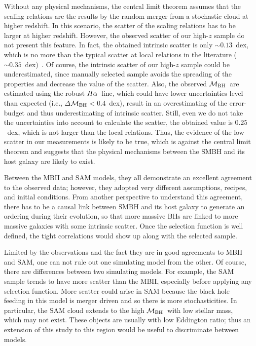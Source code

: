 \documentclass{natureprintstyle}
\newcommand{\mbh}{$\mathcal M_{\rm BH}$}
\newcommand{\halpha}{${\it H}\alpha$}
\begin{document}
Without any physical mechanisms, the central limit theorem assumes that the scaling relations are the results by the random merger from a stochastic cloud at higher redshift. In this scenario, the scatter of the scaling relations has to be larger at higher redshift. However, the observed scatter of our high-$z$ sample do not present this feature. In fact, the obtained intrinsic scatter is only $\sim0.13$~dex, which is no more than the typical scatter at local relations in the literature ($\sim0.35$~dex)~\cite{Kormendy13, Gul++09}. Of course, the intrinsic scatter of our high-$z$ sample could be underestimated, since manually selected sample avoids the spreading of the properties and decrease the value of the scatter. Also, the observed \mbh\ are estimated using the robust \halpha\ line, which could have lower uncertainties level than expected (i.e., $\Delta$\mbh$<0.4$~dex), result in an overestimating of the error-budget and thus underestimating of intrinsic scatter. Still, even we do not take the uncertainties into account to calculate the scatter, the obtained value is $0.25$~dex, which is not larger than the local relations. Thus, the evidence of the low scatter in our measurements is likely to be true, which is against the central limit theorem and suggests that the physical mechanisms between the SMBH and its host galaxy are likely to exist. 

Between the MBII and SAM models, they all demonstrate an excellent agreement to the observed data; however, they adopted very different assumptions, recipes, and initial conditions. From another perspective to understand this agreement, there has to be a causal link between SMBH and its host galaxy to generate an ordering during their evolution, so that more massive BHs are linked to more massive galaxies with some intrinsic scatter. Once the selection function is well defined, the tight correlations would show up along with the selected sample.

Limited by the observations and the fact they are in good agreements to MBII and SAM, one can not rule out one simulating model from the other. Of course, there are differences between two simulating models. For example, the SAM sample trends to have more scatter than the MBII, especially before applying any selection function. More scatter could arise in SAM because the black hole feeding in this model is merger driven and so there is more stochasticities. In particular, the SAM cloud extends to the high \mbh\ with low stellar mass, which may not exist. These objects are usually with low Eddington ratio; thus an extension of this study to this region would be useful to discriminate between models.
\end{document}

